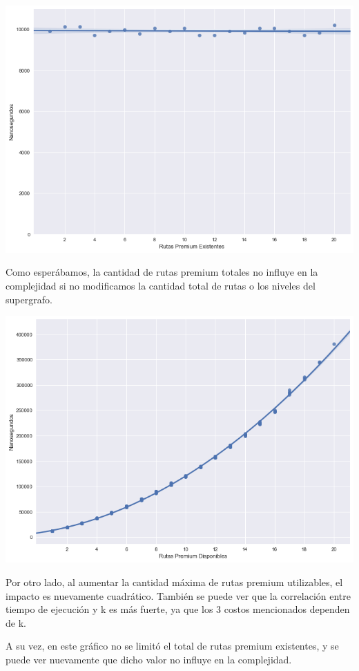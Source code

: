 \begin{center}
	\includegraphics[scale=0.5]{imagenes/ej1-3.png}
\end{center}

Como esperábamos, la cantidad de rutas premium totales no influye en la complejidad si no modificamos la cantidad total de rutas o los niveles del supergrafo.

\begin{center}
	\includegraphics[scale=0.5]{imagenes/ej1-4.png}
\end{center}

Por otro lado, al aumentar la cantidad máxima de rutas premium utilizables, el impacto es nuevamente cuadrático. También se puede ver que la correlación entre tiempo de ejecución y k es más fuerte, ya que los 3 costos mencionados dependen de k.

A su vez, en este gráfico no se limitó el total de rutas premium existentes, y se puede ver nuevamente que dicho valor no influye en la complejidad.
